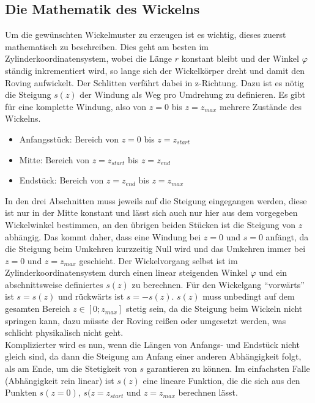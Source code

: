 \documentclass[paper=A4,pagesize,DIV=18, 12pt,listof=totoc,bibliography=totoc,headings=optiontohead,open=any]{article}
\begin{document}



\subsection{Die Mathematik des Wickelns}
Um die gewünschten Wickelmuster zu erzeugen ist es wichtig, dieses zuerst mathematisch zu beschreiben. Dies geht am besten im Zylinderkoordinatensystem, wobei die Länge $r$ konstant bleibt und der Winkel $\varphi$ ständig inkrementiert wird, so lange sich der Wickelkörper dreht und damit den Roving aufwickelt. Der Schlitten verfährt dabei in z-Richtung. Dazu ist es nötig die Steigung $s(z)$ der Windung als Weg pro Umdrehung zu definieren. Es gibt für eine komplette Windung, also von $z = 0$ bis $z = z_{max}$ mehrere Zustände des Wickelns.\\
\begin{itemize}
	\item Anfangsstück: Bereich von $z = 0$ bis $z = z_{start}$
	\item Mitte: Bereich von $z = z_{start}$ bis $z = z_{end}$
	\item Endstück: Bereich von $z = z_{end}$ bis $z = z_{max}$
\end{itemize}
In den drei Abschnitten muss jeweils auf die Steigung eingegangen werden, diese ist nur in der Mitte konstant und lässt sich auch nur hier aus dem vorgegeben Wickelwinkel bestimmen, an den übrigen beiden Stücken ist die Steigung von $z$ abhängig. Das kommt daher, dass eine Windung bei $z = 0$ und $s = 0$ anfängt, da die Steigung beim Umkehren kurzzeitig Null wird und das Umkehren immer bei $z = 0$ und $z = z_{max}$ geschieht. Der Wickelvorgang selbst ist im Zylinderkoordinatensystem durch einen linear steigenden Winkel $\varphi$ und ein abschnittsweise definiertes $s(z)$ zu berechnen. Für den Wickelgang \enquote{vorwärts} ist $s = s(z)$ und rückwärts ist $s = -s(z)$. $s(z)$ muss unbedingt auf dem gesamten Bereich $z \in [0; z_{max}]$ stetig sein, da die Steigung beim Wickeln nicht springen kann, dazu müsste der Roving reißen oder umgesetzt werden, was schlicht physikalisch nicht geht.\\
Komplizierter wird es nun, wenn die Längen von Anfangs- und Endstück nicht gleich sind, da dann die Steigung am Anfang einer anderen Abhängigkeit folgt, als am Ende, um die Stetigkeit von $s$ garantieren zu können. Im einfachsten Falle (Abhängigkeit rein linear) ist $s(z)$ eine lineare Funktion, die die sich aus den Punkten $s(z = 0)$, $s(z = z_{start}$ und $z = z_{max}$ berechnen lässt.\\
\end{document}
